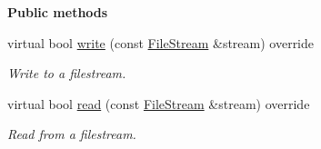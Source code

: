 \begin{Indent}\textbf{ Public methods}\par
\begin{DoxyCompactItemize}
\item 
\mbox{\label{classrev_1_1_protocol_a8ca7b8fa75e6026609b20d5e6c91fb43}} 
virtual bool \mbox{\hyperlink{classrev_1_1_protocol_a8ca7b8fa75e6026609b20d5e6c91fb43}{write}} (const \mbox{\hyperlink{classrev_1_1_file_stream}{File\+Stream}} \&stream) override
\begin{DoxyCompactList}\small\item\em Write to a filestream. \end{DoxyCompactList}\item 
\mbox{\label{classrev_1_1_protocol_a5337bf3ee68d2bb8c9cd24963d101895}} 
virtual bool \mbox{\hyperlink{classrev_1_1_protocol_a5337bf3ee68d2bb8c9cd24963d101895}{read}} (const \mbox{\hyperlink{classrev_1_1_file_stream}{File\+Stream}} \&stream) override
\begin{DoxyCompactList}\small\item\em Read from a filestream. \end{DoxyCompactList}\end{DoxyCompactItemize}
\end{Indent}
